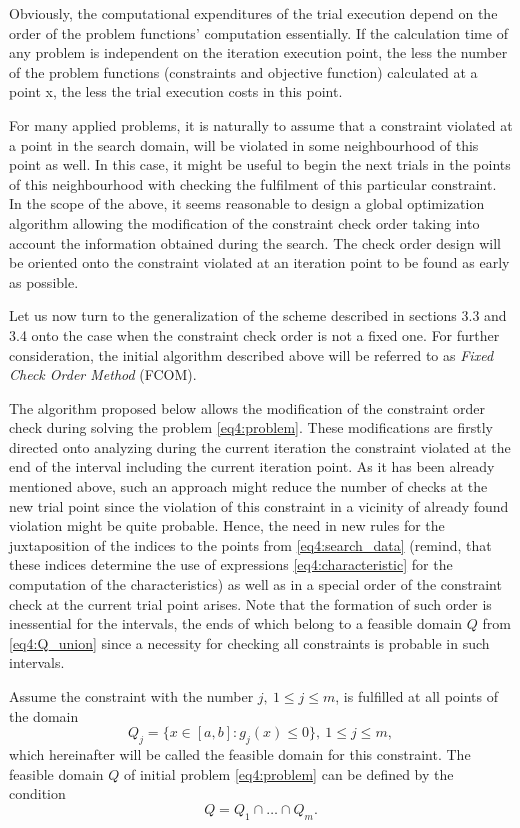 Obviously, the computational expenditures of the trial execution depend on the order of the problem functions’ computation essentially. If the calculation time of any problem is independent on the iteration execution point, the less the number of the problem functions (constraints and objective function) calculated at a point x, the less the trial execution costs in this point.

For many applied problems, it is naturally to assume that a constraint violated at a point in the search domain, will be violated in some neighbourhood of this point as well. In this case, it might be useful to begin the next trials in the points of this neighbourhood with checking the fulfilment of this particular constraint. In the scope of the above, it seems reasonable to design a global optimization algorithm allowing the modification of the constraint  check order taking into account the information obtained during the search. The check order design will be oriented onto the constraint violated at an iteration point to be found as early as possible.

Let us now turn to the generalization of the scheme described in sections 3.3 and 3.4 onto the case when the constraint check order is not a fixed one. For further consideration, the initial algorithm described above will be referred to as \emph{Fixed Check Order Method} (FCOM).

The algorithm proposed below allows the modification of the constraint order check during solving the problem \eqref{eq4:problem}. These modifications are firstly directed onto analyzing during the current iteration the constraint violated at the end of the interval including the current iteration point. As it has been already mentioned above, such an approach might reduce the number of checks at the new trial point since the violation of this constraint in a vicinity of already found violation might be quite probable. Hence, the need in new rules for the juxtaposition of the indices to the points from \eqref{eq4:search_data} (remind, that these indices determine the use of expressions \eqref{eq4:characteristic} for the computation of the characteristics) as well as in a special order
of the constraint check at the current trial point arises. Note that the formation of such order is inessential for the intervals, the ends of which belong to a feasible domain $Q$ from \eqref{eq4:Q_union} since a necessity for checking all constraints is probable in such intervals.

Assume the constraint with the number $j,\: 1\le j\le m$, is fulfilled at all points of the domain
\begin{equation}
  \label{eq4:30}
  Q_j=\{x\in[a,b]:g_j(x)\le 0\},\: 1\le j\le m,
\end{equation}
which hereinafter will be called the feasible domain for this constraint. The feasible domain $Q$ of initial problem \eqref{eq4:problem} can be defined by the condition
\begin{equation}
  \label{eq4:Q_union}
  Q=Q_1\cap\dots\cap Q_m.
\end{equation}

